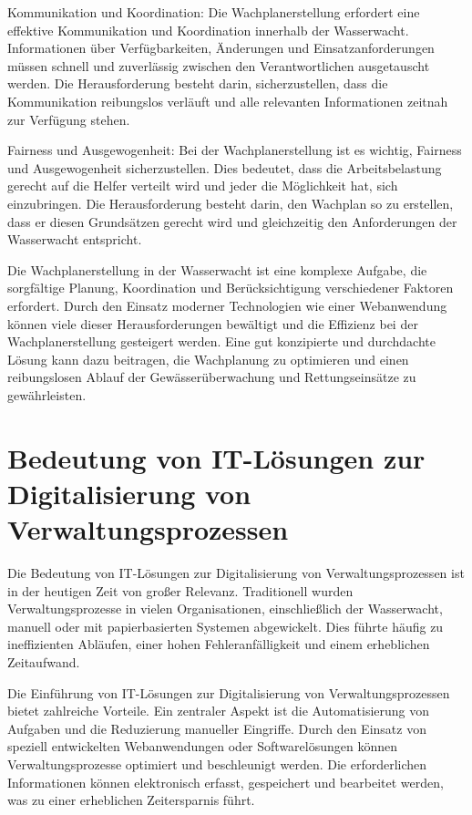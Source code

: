 \documentclass[fontsize=12pt,openright,oneside,paper=a4,BCOR=1cm]{scrbook}
\begin{document}
    Kommunikation und Koordination: Die Wachplanerstellung erfordert eine effektive Kommunikation und Koordination innerhalb der Wasserwacht. Informationen über Verfügbarkeiten, Änderungen und Einsatzanforderungen müssen schnell und zuverlässig zwischen den Verantwortlichen ausgetauscht werden. Die Herausforderung besteht darin, sicherzustellen, dass die Kommunikation reibungslos verläuft und alle relevanten Informationen zeitnah zur Verfügung stehen.

    Fairness und Ausgewogenheit: Bei der Wachplanerstellung ist es wichtig, Fairness und Ausgewogenheit sicherzustellen. Dies bedeutet, dass die Arbeitsbelastung gerecht auf die Helfer verteilt wird und jeder die Möglichkeit hat, sich einzubringen. Die Herausforderung besteht darin, den Wachplan so zu erstellen, dass er diesen Grundsätzen gerecht wird und gleichzeitig den Anforderungen der Wasserwacht entspricht.

Die Wachplanerstellung in der Wasserwacht ist eine komplexe Aufgabe, die sorgfältige Planung, Koordination und Berücksichtigung verschiedener Faktoren erfordert. Durch den Einsatz moderner Technologien wie einer Webanwendung können viele dieser Herausforderungen bewältigt und die Effizienz bei der Wachplanerstellung gesteigert werden. Eine gut konzipierte und durchdachte Lösung kann dazu beitragen, die Wachplanung zu optimieren und einen reibungslosen Ablauf der Gewässerüberwachung und Rettungseinsätze zu gewährleisten.

\section{Bedeutung von IT-Lösungen zur Digitalisierung von Verwaltungsprozessen} 

Die Bedeutung von IT-Lösungen zur Digitalisierung von Verwaltungsprozessen ist in der heutigen Zeit von großer Relevanz. Traditionell wurden Verwaltungsprozesse in vielen Organisationen, einschließlich der Wasserwacht, manuell oder mit papierbasierten Systemen abgewickelt. Dies führte häufig zu ineffizienten Abläufen, einer hohen Fehleranfälligkeit und einem erheblichen Zeitaufwand.

Die Einführung von IT-Lösungen zur Digitalisierung von Verwaltungsprozessen bietet zahlreiche Vorteile. Ein zentraler Aspekt ist die Automatisierung von Aufgaben und die Reduzierung manueller Eingriffe. Durch den Einsatz von speziell entwickelten Webanwendungen oder Softwarelösungen können Verwaltungsprozesse optimiert und beschleunigt werden. Die erforderlichen Informationen können elektronisch erfasst, gespeichert und bearbeitet werden, was zu einer erheblichen Zeitersparnis führt.
\end{document}
